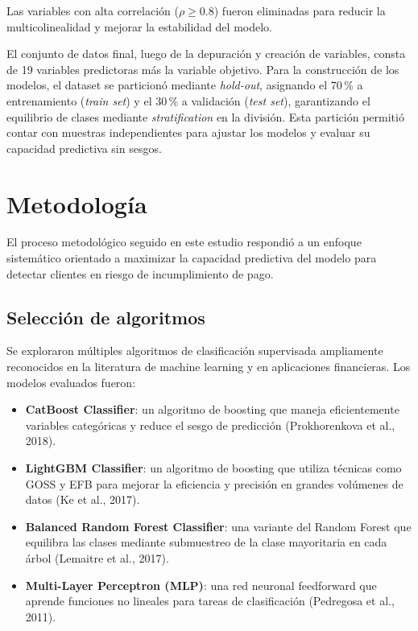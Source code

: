 \documentclass[journal]{apa7}
\begin{document}
Las variables con alta correlación ($\rho \geq 0.8$) fueron eliminadas para reducir la multicolinealidad y mejorar la estabilidad del modelo.

El conjunto de datos final, luego de la depuración y creación de variables, consta de 19 variables predictoras más la variable objetivo. Para la construcción de los modelos, el dataset se particionó mediante \emph{hold-out}, asignando el 70\,\% a entrenamiento (\emph{train set}) y el 30\,\% a validación (\emph{test set}), garantizando el equilibrio de clases mediante \emph{stratification} en la división. Esta partición permitió contar con muestras independientes para ajustar los modelos y evaluar su capacidad predictiva sin sesgos.

\section{Metodología}

El proceso metodológico seguido en este estudio respondió a un enfoque sistemático orientado a maximizar la capacidad predictiva del modelo para detectar clientes en riesgo de incumplimiento de pago.

\subsection{Selección de algoritmos}

Se exploraron múltiples algoritmos de clasificación supervisada ampliamente reconocidos en la literatura de machine learning y en aplicaciones financieras. Los modelos evaluados fueron:

\begin{itemize}
  \item \textbf{CatBoost Classifier}: un algoritmo de boosting que maneja eficientemente variables categóricas y reduce el sesgo de predicción (Prokhorenkova et al., 2018).
  \item \textbf{LightGBM Classifier}: un algoritmo de boosting que utiliza técnicas como GOSS y EFB para mejorar la eficiencia y precisión en grandes volúmenes de datos (Ke et al., 2017).
  \item \textbf{Balanced Random Forest Classifier}: una variante del Random Forest que equilibra las clases mediante submuestreo de la clase mayoritaria en cada árbol (Lemaitre et al., 2017).
  \item \textbf{Multi-Layer Perceptron (MLP)}: una red neuronal feedforward que aprende funciones no lineales para tareas de clasificación (Pedregosa et al., 2011).
\end{itemize}
\end{document}
